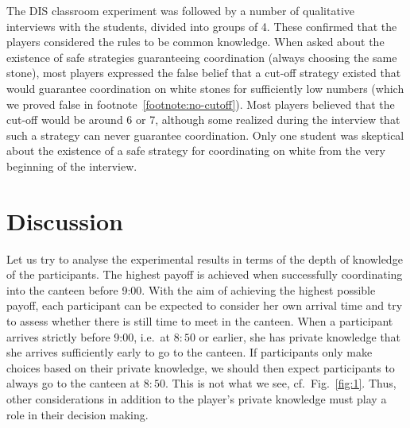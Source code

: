 The DIS classroom experiment was followed by a number of qualitative interviews with the students, divided into groups of 4.  These confirmed that the players considered the rules to be common knowledge. 
When asked about the existence of safe strategies guaranteeing coordination (always choosing the same stone), 
most players expressed the false belief that a cut-off strategy existed that would guarantee coordination on white stones for sufficiently low numbers (which we proved false in footnote~\ref{footnote:no-cutoff}). Most players believed that the cut-off would be around 6 or 7,  
although some realized during the interview that such a  strategy can never guarantee coordination. Only one student was skeptical about the existence of a safe strategy for coordinating on white from the very beginning of the interview. 




\section{Discussion}\label{discussion}
Let us try to analyse the experimental results in terms of the depth of knowledge of the participants. The highest payoff is achieved when successfully coordinating into the canteen before 9:00. With the aim of achieving the highest possible payoff, each participant can be expected to consider her own arrival time and try to assess whether there is still time to meet in the canteen. When a participant arrives strictly before 9:00, i.e.\ at $8{:}50$ or earlier, she has private knowledge that she arrives sufficiently early to go to the canteen. If participants only make choices based on their private knowledge, we should then expect participants to always go to the canteen at $8{:}50$. This is not what we see, cf.\ Fig.~\ref{fig:1}. Thus, other considerations in addition to the player's private knowledge must play a role in their decision making.

